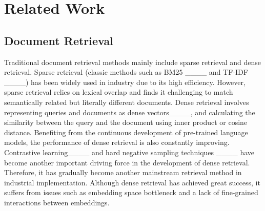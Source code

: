 \section{Related Work}
\subsection{Document Retrieval}
Traditional document retrieval methods mainly include sparse retrieval and dense retrieval.
Sparse retrieval (classic methods such as BM25 ____ and TF-IDF ____) has been widely used in industry due to its high efficiency.
However, sparse retrieval relies on lexical overlap and finds it challenging to match semantically related but literally different documents.
Dense retrieval involves representing queries and documents as dense vectors____, and calculating the similarity between the query and the document using inner product or cosine distance. 
Benefiting from the continuous development of pre-trained language models, the performance of dense retrieval is also constantly improving. Contrastive learning____ and hard negative sampling techniques ____ have become another important driving force in the development of dense retrieval.
Therefore, it has gradually become another mainstream retrieval method in industrial implementation. Although dense retrieval has achieved great success, it suffers from issues such as embedding space bottleneck and a lack of fine-grained interactions between embeddings. 
